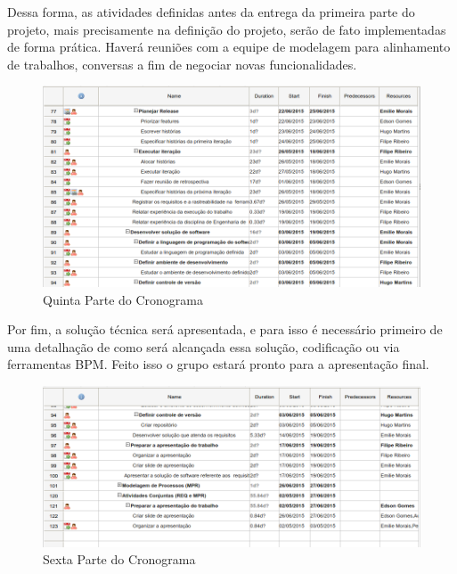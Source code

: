 Dessa forma, as atividades definidas antes da entrega da primeira parte do projeto, mais precisamente na definição do projeto, serão de fato implementadas 
de forma prática. Haverá reuniões com a equipe de modelagem para alinhamento de trabalhos, conversas a fim de negociar novas funcionalidades.

\begin{figure}[!htb]
\centering
\includegraphics[scale=0.46]{figuras/cronograma5.png}
\caption{Quinta Parte do Cronograma}
\end{figure}

Por fim, a solução técnica será apresentada, e para isso é necessário primeiro de uma detalhação de como será alcançada essa solução, 
codificação ou via ferramentas BPM. Feito isso o grupo estará pronto para a apresentação final.

\begin{figure}[!htb]
\centering
\includegraphics[scale=0.55]{figuras/cronograma6.png}
\caption{Sexta Parte do Cronograma}
\end{figure}
